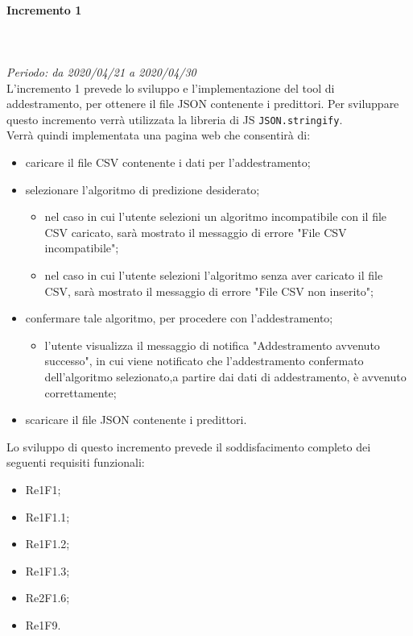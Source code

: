 \paragraph{Incremento 1}\mbox{} \\ \mbox{} \\ 
\textit{Periodo: da 2020/04/21 a 2020/04/30}\\
L’incremento 1 prevede lo sviluppo e l’implementazione del tool di addestramento, per ottenere il file JSON contenente i predittori. Per sviluppare questo incremento verrà utilizzata la libreria di JS \texttt{JSON.stringify}. \\
Verrà quindi implementata una pagina web che consentirà di: \begin{itemize}
\item caricare il file CSV contenente i dati per l'addestramento;
\item selezionare l'algoritmo di predizione desiderato;
\begin{itemize}
\item nel caso in cui l’utente selezioni un algoritmo incompatibile con il file CSV caricato, sarà mostrato il messaggio di errore "File CSV incompatibile";
\item nel caso in cui l'utente selezioni l'algoritmo senza aver caricato il file CSV, sarà mostrato il messaggio di errore "File CSV non inserito";
\end{itemize}
\item confermare tale algoritmo, per procedere con l'addestramento;
\begin{itemize}
\item l’utente visualizza il messaggio di notifica "Addestramento avvenuto successo", in cui viene notificato che l’addestramento confermato dell’algoritmo selezionato,a partire dai dati di addestramento, è avvenuto correttamente;
\end{itemize}
\item scaricare il file JSON contenente i predittori.
\end{itemize}
Lo sviluppo di questo incremento prevede il soddisfacimento completo dei seguenti requisiti funzionali:
\begin{itemize}
\item Re1F1;
\item Re1F1.1;
\item Re1F1.2;
\item Re1F1.3;
\item Re2F1.6;
\item Re1F9.
\end{itemize}
